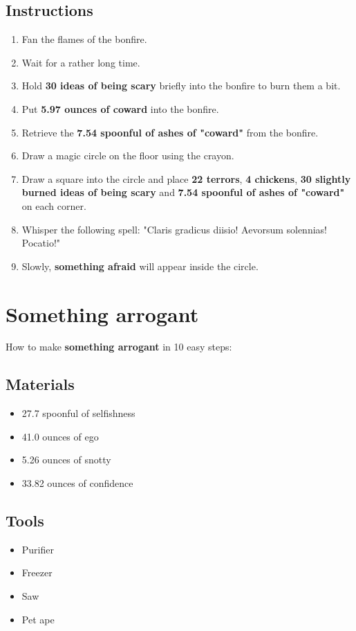 \documentclass{article}
\begin{document}
\subsection{Instructions}\begin{enumerate}
\item 
Fan the flames of the bonfire.
\item 
Wait for a rather long time.
\item 
Hold \textbf{30 ideas of being scary} briefly into the bonfire to burn them a bit.
\item 
Put \textbf{5.97 ounces of coward} into the bonfire.
\item 
Retrieve the \textbf{7.54 spoonful of ashes of "coward"} from the bonfire.
\item 
Draw a magic circle on the floor using the crayon.
\item 
Draw a square into the circle and place \textbf{22 terrors}, \textbf{4 chickens}, \textbf{30 slightly burned ideas of being scary} and \textbf{7.54 spoonful of ashes of "coward"} on each corner.
\item 
Whisper the following spell: "Claris gradicus diisio! Aevorsum solennias! Pocatio!"
\item 
Slowly, \textbf{something afraid} will appear inside the circle.
\end{enumerate}
\newpage
\section{Something arrogant}How to make \textbf{something arrogant} in 10 easy steps:

\subsection{Materials}\begin{itemize}
\item 
27.7 spoonful of selfishness
\item 
41.0 ounces of ego
\item 
5.26 ounces of snotty
\item 
33.82 ounces of confidence
\end{itemize}
\subsection{Tools}\begin{itemize}
\item 
Purifier
\item 
Freezer
\item 
Saw
\item 
Pet ape
\end{itemize}
\end{document}
